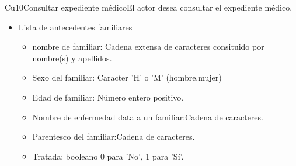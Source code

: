\begin{UseCase}{Cu10}{Consultar expediente médico}{El actor desea consultar el expediente médico.}
{\begin{itemize}
  \item Lista de antecedentes familiares
        
        \begin{itemize}
            \item nombre de familiar: Cadena extensa de caracteres consituido por nombre(s) y apellidos.
            \item Sexo del familiar: Caracter 'H' o 'M' (hombre,mujer)
            \item Edad de familiar: Número entero positivo.
            \item Nombre de enfermedad data a un familiar:Cadena de caracteres.
            \item Parentesco del familiar:Cadena de caracteres.
            \item Tratada: booleano 0 para 'No', 1 para 'Sí'.

        \end{itemize}
       \end{itemize}
    }
\end{UseCase}
